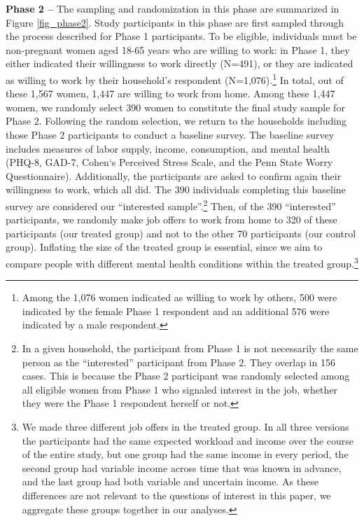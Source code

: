 \documentclass[12pt, a4paper, american]{article}
\begin{document}
\textbf{Phase 2 --} The sampling and randomization in this phase are summarized in Figure \ref{fig_phase2}. Study participants in this phase are first sampled through the process described for Phase 1 participants. To be eligible, individuals must be non-pregnant women aged 18-65 years who are willing to work: in Phase 1, they either indicated their willingness to work directly (N=491), or they are indicated as willing to work by their household's respondent (N=1,076).\footnote{Among the 1,076 women indicated as willing to work by others, 500 were indicated by the female Phase 1 respondent and an additional 576 were indicated by a male respondent.} In total, out of these 1,567 women, 1,447 are willing to work from home. Among these 1,447 women, we randomly select 390 women to constitute the final study sample for Phase 2. Following the random selection, we return to the households including those Phase 2 participants to conduct a baseline survey. The baseline survey includes measures of labor supply, income, consumption, and mental health (PHQ-8, GAD-7, Cohen‘s Perceived Stress Scale, and the Penn State Worry Questionnaire). Additionally, the participants are asked to confirm again their willingness to work, which all did. The 390 individuals completing this baseline survey are considered our ``interested sample''.\footnote{In a given household, the participant from Phase 1 is not necessarily the same person as the ``interested'' participant from Phase 2. They overlap in 156 cases. This is because the Phase 2 participant was randomly selected among all eligible women from Phase 1 who signaled interest in the job, whether they were the Phase 1 respondent herself or not.} Then, of the 390 ``interested'' participants, we randomly make job offers to work from home to 320 of these participants (our treated group) and not to the other 70 participants (our control group). Inflating the size of the treated group is essential, since we aim to compare people with different mental health conditions within the treated group.\footnote{We made three different job offers in the treated group. In all three versions the participants had the same expected workload and income over the course of the entire study, but one group had the same income in every period, the second group had variable income across time that was known in advance, and the last group had both variable and uncertain income. As these differences are not relevant to the questions of interest in this paper, we aggregate these groups together in our analyses.} 
\end{document}
